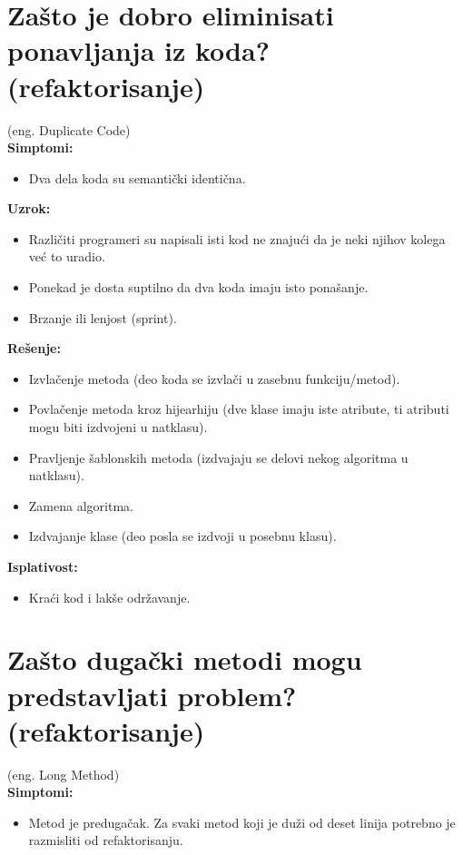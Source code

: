\documentclass[a4paper]{article}
\begin{document}
\section{Zašto je dobro eliminisati ponavljanja iz koda? (refaktorisanje)}
  (eng. Duplicate Code)\\
  \textbf{Simptomi:}
  \begin{itemize}
    \item Dva dela koda su semantički identična.
  \end{itemize}

  \noindent \textbf{Uzrok:} 
  \begin{itemize}
    \item Različiti programeri su napisali isti kod ne znajući da je neki njihov kolega već
          to uradio.
    \item Ponekad je dosta suptilno da dva koda imaju isto ponašanje.
    \item Brzanje ili lenjost (sprint).
  \end{itemize}

  \noindent \textbf{Rešenje:} 
  \begin{itemize}
    \item Izvlačenje metoda (deo koda se izvlači u zasebnu funkciju/metod).
    \item Povlačenje metoda kroz hijearhiju (dve klase imaju iste atribute, ti atributi
          mogu biti izdvojeni u natklasu).
    \item Pravljenje šablonskih metoda (izdvajaju se delovi nekog algoritma u natklasu).
    \item Zamena algoritma.
    \item Izdvajanje klase (deo posla se izdvoji u posebnu klasu).
  \end{itemize}

  \noindent \textbf{Isplativost:} 
  \begin{itemize}
    \item Kraći kod i lakše održavanje.
  \end{itemize}

\section{Zašto dugački metodi mogu predstavljati problem? (refaktorisanje)}
  (eng. Long Method)\\
  \textbf{Simptomi:}
  \begin{itemize}
    \item Metod je predugačak. Za svaki metod koji je duži od deset linija potrebno je
          razmisliti od refaktorisanju.
  \end{itemize}
\end{document}
